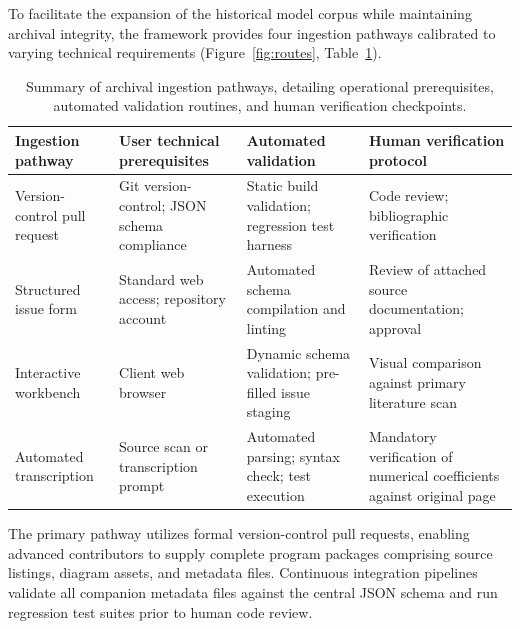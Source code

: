 \documentclass[3p,times,authoryear,twocolumn]{elsarticle}
\begin{document}
To facilitate the expansion of the historical model corpus while maintaining archival integrity, the framework provides four ingestion pathways calibrated to varying technical requirements (Figure~\ref{fig:routes}, Table~\ref{tab:routes}).

\begin{table}[t]
\centering\small
\begin{tabularx}{\linewidth}{@{}lXXX@{}}
\toprule
Ingestion pathway & User technical prerequisites & Automated validation & Human verification protocol \\
\midrule
Version-control pull request & Git version-control; JSON schema compliance & Static build validation; regression test harness & Code review; bibliographic verification \\
Structured issue form & Standard web access; repository account & Automated schema compilation and linting & Review of attached source documentation; approval \\
Interactive workbench & Client web browser & Dynamic schema validation; pre-filled issue staging & Visual comparison against primary literature scan \\
Automated transcription & Source scan or transcription prompt & Automated parsing; syntax check; test execution & Mandatory verification of numerical coefficients against original page \\
\bottomrule
\end{tabularx}
\caption{Summary of archival ingestion pathways, detailing operational prerequisites, automated validation routines, and human verification checkpoints.}
\label{tab:routes}
\end{table}

The primary pathway utilizes formal version-control pull requests, enabling advanced contributors to supply complete program packages comprising source listings, diagram assets, and metadata files. Continuous integration pipelines validate all companion metadata files against the central JSON schema and run regression test suites prior to human code review.
\end{document}
